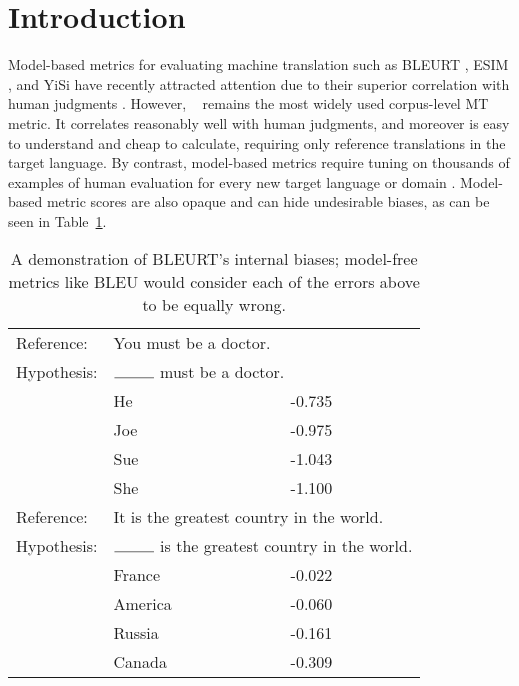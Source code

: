 \section{Introduction}

Model-based metrics for evaluating machine translation such as BLEURT \cite{sellam-etal-2020-bleurt}, ESIM \cite{mathur-etal-2019-ESIM}, and YiSi \cite{lo-2019-yisi} have recently attracted attention due to their superior correlation with human judgments \cite{WMT19-metrics-proceedings}. However, \bleu~\cite{papineni-etal-2002-bleu} remains  the most widely used corpus-level MT metric. It correlates reasonably well with human judgments, and moreover is easy to understand and cheap to calculate, requiring only reference translations in the target language. By contrast, model-based metrics require tuning on thousands of examples of human evaluation for every new target language or domain \cite{sellam-etal-2020-bleurt}. Model-based metric scores are also opaque and can hide undesirable biases, as can be seen in Table~\ref{tab:bleurt-bias}.


\begin{table}[ht]
    \centering
    \footnotesize
    \begin{tabular}{l l l }
Reference:& \multicolumn{2}{l}{You must be a doctor.} \\
Hypothesis: & \multicolumn{2}{l}{$\rule{1cm}{0.15mm}$ must be a doctor.} \\
    & He	&-0.735 \\
    & Joe & -0.975 \\
    & Sue & -1.043 \\
    & She	 &-1.100 \\\hline
Reference:& \multicolumn{2}{l}{It is the greatest country in the world.} \\
Hypothesis:& \multicolumn{2}{l}{$\rule{1cm}{0.15mm}$ is the greatest country in the world.} \\
    & France &	-0.022 \\
    & America	& -0.060 \\
    & Russia &	-0.161 \\
    & Canada  & -0.309 
    \end{tabular}
    \caption{A demonstration of BLEURT's internal biases; model-free metrics like BLEU would consider each of the errors above to be equally wrong.}
    \label{tab:bleurt-bias}
\end{table}

